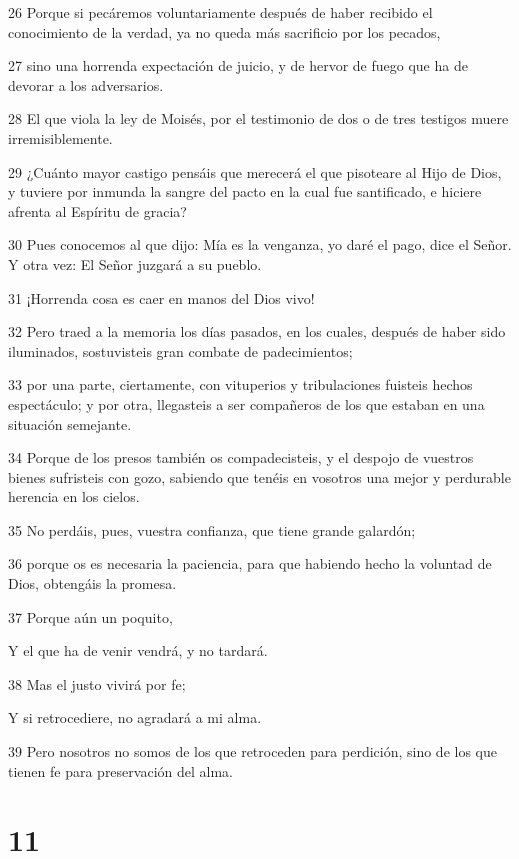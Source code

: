 \par 26 Porque si pecáremos voluntariamente después de haber recibido el conocimiento de la verdad, ya no queda más sacrificio por los pecados,
\par 27 sino una horrenda expectación de juicio, y de hervor de fuego que ha de devorar a los adversarios.
\par 28 El que viola la ley de Moisés, por el testimonio de dos o de tres testigos muere irremisiblemente.
\par 29 ¿Cuánto mayor castigo pensáis que merecerá el que pisoteare al Hijo de Dios, y tuviere por inmunda la sangre del pacto en la cual fue santificado, e hiciere afrenta al Espíritu de gracia?
\par 30 Pues conocemos al que dijo: Mía es la venganza, yo daré el pago, dice el Señor. Y otra vez: El Señor juzgará a su pueblo.
\par 31 ¡Horrenda cosa es caer en manos del Dios vivo!
\par 32 Pero traed a la memoria los días pasados, en los cuales, después de haber sido iluminados, sostuvisteis gran combate de padecimientos;
\par 33 por una parte, ciertamente, con vituperios y tribulaciones fuisteis hechos espectáculo; y por otra, llegasteis a ser compañeros de los que estaban en una situación semejante.
\par 34 Porque de los presos también os compadecisteis, y el despojo de vuestros bienes sufristeis con gozo, sabiendo que tenéis en vosotros una mejor y perdurable herencia en los cielos.
\par 35 No perdáis, pues, vuestra confianza, que tiene grande galardón;
\par 36 porque os es necesaria la paciencia, para que habiendo hecho la voluntad de Dios, obtengáis la promesa.
\par 37 Porque aún un poquito,
\par Y el que ha de venir vendrá, y no tardará.
\par 38 Mas el justo vivirá por fe;
\par Y si retrocediere, no agradará a mi alma.
\par 39 Pero nosotros no somos de los que retroceden para perdición, sino de los que tienen fe para preservación del alma.

\chapter{11}


